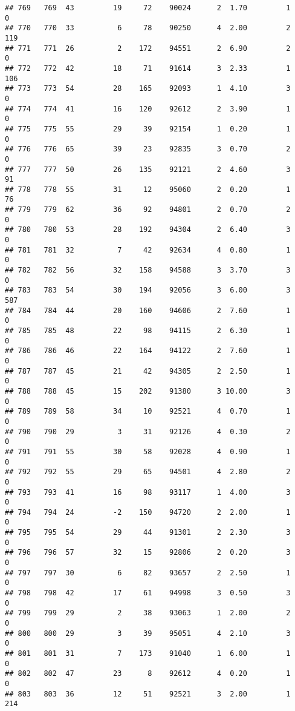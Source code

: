 \documentclass[
]{article}
\begin{document}
\begin{verbatim}
## 769   769  43         19     72    90024      2  1.70         1        0
## 770   770  33          6     78    90250      4  2.00         2      119
## 771   771  26          2    172    94551      2  6.90         2        0
## 772   772  42         18     71    91614      3  2.33         1      106
## 773   773  54         28    165    92093      1  4.10         3        0
## 774   774  41         16    120    92612      2  3.90         1        0
## 775   775  55         29     39    92154      1  0.20         1        0
## 776   776  65         39     23    92835      3  0.70         2        0
## 777   777  50         26    135    92121      2  4.60         3       91
## 778   778  55         31     12    95060      2  0.20         1       76
## 779   779  62         36     92    94801      2  0.70         2        0
## 780   780  53         28    192    94304      2  6.40         3        0
## 781   781  32          7     42    92634      4  0.80         1        0
## 782   782  56         32    158    94588      3  3.70         3        0
## 783   783  54         30    194    92056      3  6.00         3      587
## 784   784  44         20    160    94606      2  7.60         1        0
## 785   785  48         22     98    94115      2  6.30         1        0
## 786   786  46         22    164    94122      2  7.60         1        0
## 787   787  45         21     42    94305      2  2.50         1        0
## 788   788  45         15    202    91380      3 10.00         3        0
## 789   789  58         34     10    92521      4  0.70         1        0
## 790   790  29          3     31    92126      4  0.30         2        0
## 791   791  55         30     58    92028      4  0.90         1        0
## 792   792  55         29     65    94501      4  2.80         2        0
## 793   793  41         16     98    93117      1  4.00         3        0
## 794   794  24         -2    150    94720      2  2.00         1        0
## 795   795  54         29     44    91301      2  2.30         3        0
## 796   796  57         32     15    92806      2  0.20         3        0
## 797   797  30          6     82    93657      2  2.50         1        0
## 798   798  42         17     61    94998      3  0.50         3        0
## 799   799  29          2     38    93063      1  2.00         2        0
## 800   800  29          3     39    95051      4  2.10         3        0
## 801   801  31          7    173    91040      1  6.00         1        0
## 802   802  47         23      8    92612      4  0.20         1        0
## 803   803  36         12     51    92521      3  2.00         1      214

\end{verbatim}
\end{document}
